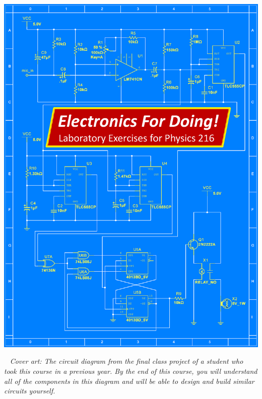 \thispagestyle{empty}

\begin{center}\includegraphics[width=8.49in]{electronics_front_pages/electronics_front_cover_kuri.eps}

\end{center}
\newpage

\restoregeometry
\restorepagecolor
\thispagestyle{empty}

\
\vfill
\textit{Cover art: The circuit diagram from the final class project of a student who took this course in a previous year.  By the end of this course, you will understand all of the components in this diagram and will be able to design and build similar circuits  yourself.}
\pagebreak



